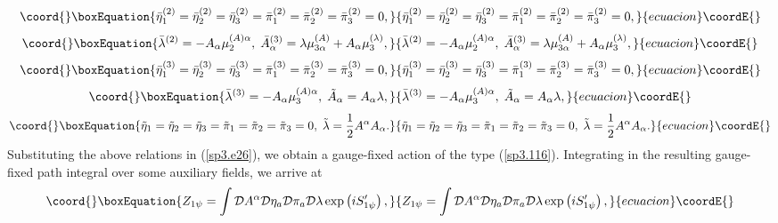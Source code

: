 \documentclass[a4paper,12pt]{article}
\begin{document}
\begin{equation}\coord{}\boxEquation{
\bar{\eta}_{1}^{(2)}=\bar{\eta}_{2}^{(2)}=\bar{\eta}_{3}^{(2)}=\bar{\pi}
_{1}^{(2)}=\bar{\pi}_{2}^{(2)}=\bar{\pi}_{3}^{(2)}=0,  \label{sp3.e31}
}{
\bar{\eta}_{1}^{(2)}=\bar{\eta}_{2}^{(2)}=\bar{\eta}_{3}^{(2)}=\bar{\pi}
_{1}^{(2)}=\bar{\pi}_{2}^{(2)}=\bar{\pi}_{3}^{(2)}=0,  }{ecuacion}\coordE{}\end{equation}
\begin{equation}\coord{}\boxEquation{
\bar{\lambda}^{(2)}=-A_{\alpha }\mu _{2}^{(A)\alpha },\;\bar{A}_{\alpha
}^{(3)}=\lambda \mu _{3\alpha }^{(A)}+A_{\alpha }\mu _{3}^{(\lambda )},
\label{sp3.e32}
}{
\bar{\lambda}^{(2)}=-A_{\alpha }\mu _{2}^{(A)\alpha },\;\bar{A}_{\alpha
}^{(3)}=\lambda \mu _{3\alpha }^{(A)}+A_{\alpha }\mu _{3}^{(\lambda )},
}{ecuacion}\coordE{}\end{equation}
\begin{equation}\coord{}\boxEquation{
\bar{\eta}_{1}^{(3)}=\bar{\eta}_{2}^{(3)}=\bar{\eta}_{3}^{(3)}=\bar{\pi}
_{1}^{(3)}=\bar{\pi}_{2}^{(3)}=\bar{\pi}_{3}^{(3)}=0,  \label{sp3.e33}
}{
\bar{\eta}_{1}^{(3)}=\bar{\eta}_{2}^{(3)}=\bar{\eta}_{3}^{(3)}=\bar{\pi}
_{1}^{(3)}=\bar{\pi}_{2}^{(3)}=\bar{\pi}_{3}^{(3)}=0,  }{ecuacion}\coordE{}\end{equation}
\begin{equation}\coord{}\boxEquation{
\bar{\lambda}^{(3)}=-A_{\alpha }\mu _{3}^{(A)\alpha },\;\tilde{A}_{\alpha
}=A_{\alpha }\lambda ,  \label{sp3.e34}
}{
\bar{\lambda}^{(3)}=-A_{\alpha }\mu _{3}^{(A)\alpha },\;\tilde{A}_{\alpha
}=A_{\alpha }\lambda ,  }{ecuacion}\coordE{}\end{equation}
\begin{equation}\coord{}\boxEquation{
\tilde{\eta}_{1}=\tilde{\eta}_{2}=\tilde{\eta}_{3}=\tilde{\pi}_{1}=\tilde{\pi
}_{2}=\tilde{\pi}_{3}=0,\;\tilde{\lambda}=\frac{1}{2}A^{\alpha }A_{\alpha }.
\label{sp3.e35}
}{
\tilde{\eta}_{1}=\tilde{\eta}_{2}=\tilde{\eta}_{3}=\tilde{\pi}_{1}=\tilde{\pi
}_{2}=\tilde{\pi}_{3}=0,\;\tilde{\lambda}=\frac{1}{2}A^{\alpha }A_{\alpha }.
}{ecuacion}\coordE{}\end{equation}
Substituting the above relations in (\ref{sp3.e26}), we obtain a gauge-fixed
action of the type (\ref{sp3.116}). Integrating in the resulting gauge-fixed
path integral over some auxiliary fields, we arrive at 
\begin{equation}\coord{}\boxEquation{
Z_{1\psi }=\int \mathcal{D}A^{\alpha }\mathcal{D}\eta _{a}\mathcal{D}\pi _{a}
\mathcal{D}\lambda \exp \left( iS_{1\psi }^{\prime }\right) ,
\label{sp3.e36}
}{
Z_{1\psi }=\int \mathcal{D}A^{\alpha }\mathcal{D}\eta _{a}\mathcal{D}\pi _{a}
\mathcal{D}\lambda \exp \left( iS_{1\psi }^{\prime }\right) ,
}{ecuacion}\coordE{}\end{equation}
\end{document}
